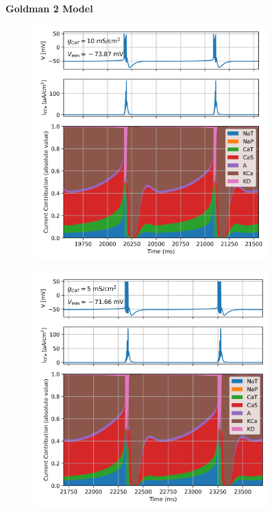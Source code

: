 \documentclass[../main.tex]{subfiles}
\begin{document}
{\begin{figure}[!t]
    \textbf{Goldman 2 Model} \\[1ex]  %

    \begin{subfigure}[t]{0.48\textwidth}
        \centering
        \includegraphics[width=\linewidth]{../img/rmp/goldman_2_g_10.png}
        \label{fig:rmp_models_contrib_10_goldman_2}
    \end{subfigure}
    \hfill
    \begin{subfigure}[t]{0.48\textwidth}
        \centering
        \includegraphics[width=\linewidth]{../img/rmp/goldman_2_g_5.png}
        \label{fig:rmp_models_contrib_5_goldman_2}
    \end{subfigure}
    

\end{figure}}
\end{document}
